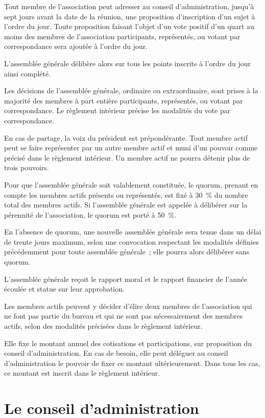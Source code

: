\documentclass[a4wide,12pt]{scrartcl}
\begin{document}
Tout membre de l'association peut adresser au conseil
d'administration, jusqu'à sept jours avant la date de la réunion, une
proposition d'inscription d'un sujet à l'ordre du jour. Toute
proposition faisant l'objet d'un vote positif d'un quart au moins des
membres de l'association participants, représentés, ou votant par
correspondance sera ajoutée à l'ordre du jour.

L'assemblée générale délibère alors sur tous les points inscrits à
l'ordre du jour ainsi complété.

Les décisions de l'assemblée générale, ordinaire ou extraordinaire,
sont prises à la majorité des membres à part entière participants,
représentés, ou votant par correspondance. Le règlement intérieur
précise les modalités du vote par correspondance.

En cas de partage, la voix du président est prépondérante. Tout membre
actif peut se faire représenter par un autre membre actif et muni d'un
pouvoir comme précisé dans le règlement intérieur. Un membre actif ne
pourra détenir plus de trois pouvoirs.

Pour que l'assemblée générale soit valablement constituée, le quorum,
prenant en compte les membres actifs présents ou représentés, est fixé
à 30~\% du nombre total des membres actifs. Si l'assemblée générale est
appelée à délibérer sur la pérennité de l'association, le quorum est porté
à 50~\%.

En l'absence de quorum, une nouvelle assemblée générale sera tenue
dans un délai de trente jours maximum, selon une convocation
respectant les modalités définies précédemment pour toute assemblée
générale~; elle pourra alors délibérer sans quorum.

L'assemblée générale reçoit le rapport moral et le rapport financier
de l'année écoulée et statue sur leur approbation.

Les membres actifs peuvent y décider d'élire deux membres de
l'association qui ne font pas partie du bureau et qui ne sont pas
nécessairement des membres actifs, selon des modalités précisées dans
le règlement intérieur.

Elle fixe le montant annuel des cotisations et participations, sur
proposition du conseil d'administration. En cas de besoin, elle peut
déléguer au conseil d'administration le pouvoir de fixer ce montant
ultérieurement. Dans tous les cas, ce montant est inscrit dans le
règlement intérieur.

\section{Le conseil d'administration}
\end{document}
